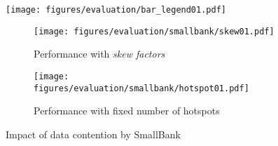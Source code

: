 \begin{figure}[]
    \centering
    \begin{minipage}{0.8\linewidth}
        \centering
        \texttt{[image: figures/evaluation/bar\_legend01.pdf]}
        \vspace{-5mm}
    \end{minipage}
    \begin{minipage}{0.95\linewidth}
        \centering
        \begin{subfigure}{1.0\linewidth}
            \texttt{[image: figures/evaluation/smallbank/skew01.pdf]}
            \vspace{-6mm}
            \caption{Performance with \textit{skew factors}}
            \label{fig:sb.skew.per}
        \end{subfigure}
        \begin{subfigure}{1.0\linewidth}
            \texttt{[image: figures/evaluation/smallbank/hotspot01.pdf]}
            \vspace{-6mm}
            \caption{Performance with fixed number of hotspots}
            \label{fig:sb.hotspot.per}
        \end{subfigure}
    \end{minipage}
    \vspace{-4mm}
    \caption{Impact of data contention by SmallBank}
    \label{fig:evaluation.contention.sb}
    \vspace{-6mm}
\end{figure}


